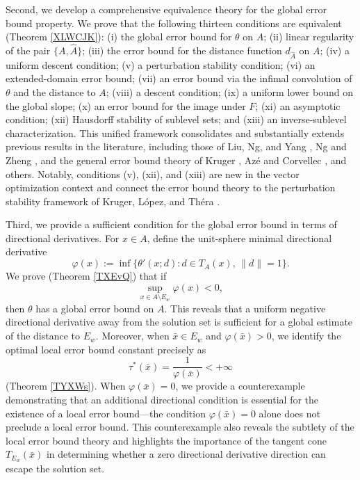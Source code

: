 \documentclass[11pt]{article}
\begin{document}
Second, we develop a comprehensive equivalence theory for the global error bound property. We prove that the following thirteen conditions are equivalent (Theorem \ref{XLWCJK}): (i) the global error bound for \(\theta\) on \(A\); (ii) linear regularity of the pair \(\{A,\widehat A\}\); (iii) the error bound for the distance function \(d_{\widehat A}\) on \(A\); (iv) a uniform descent condition; (v) a perturbation stability condition; (vi) an extended-domain error bound; (vii) an error bound via the infimal convolution of \(\theta\) and the distance to \(A\); (viii) a descent condition; (ix) a uniform lower bound on the global slope; (x) an error bound for the image under \(F\); (xi) an asymptotic   condition; (xii) Hausdorff stability of sublevel sets; and (xiii) an inverse-sublevel characterization. This unified framework consolidates and substantially extends previous results in the literature, including those of Liu, Ng, and Yang \cite{LiuNgYang2009}, Ng and Zheng \cite{NgZheng}, and the general error bound theory of Kruger \cite{Kruger}, Az\'e and Corvellec \cite{AC2004}, and others. Notably, conditions (v), (xii), and (xiii) are new in the vector optimization context and connect the error bound theory to the perturbation stability framework of Kruger, L\'opez, and Th\'era \cite{KLT2018}.

Third, we provide a sufficient condition for the global error bound in terms of directional derivatives. For \(x\in A\), define the unit-sphere minimal directional derivative
\[
\varphi(x):=\inf\{\theta'(x;d):d\in T_A(x),\,\|d\|=1\}.
\]
We prove (Theorem \ref{TXEvQ}) that if
\[
\sup_{x\in A\setminus E_w}\varphi(x)<0,
\]
then \(\theta\) has a global error bound on \(A\). This reveals that a uniform negative directional derivative away from the solution set is sufficient for a global estimate of the distance to \(E_w\).  Moreover, when \(\bar x\in E_w\) and \(\varphi(\bar x)>0\), we identify the optimal local error bound constant precisely as
\[
\tau^*(\bar x)=\frac{1}{\varphi(\bar x)}<+\infty
\]
(Theorem \ref{TYXWs}). When \(\varphi(\bar x)=0\), we provide a counterexample demonstrating that an additional directional condition is essential for the existence of a local error bound---the condition \(\varphi(\bar x)=0\) alone does not preclude a local error bound. This counterexample also reveals the subtlety of the local error bound theory and highlights the importance of the tangent cone \(T_{E_w}(\bar x)\) in determining whether a zero directional derivative direction can escape the solution set.
\end{document}
